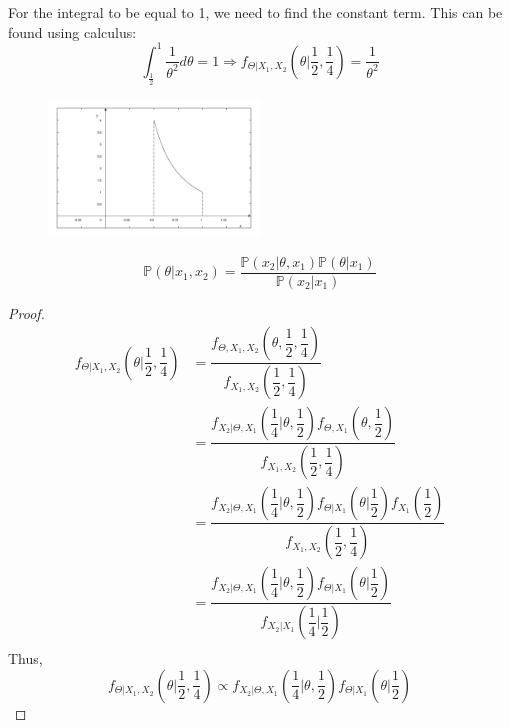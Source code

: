 \begin{eg}
  For the integral to be equal to 1, we need to find the constant term. This can be found using calculus: 
  \[
    \int_\frac{1}{2} ^1 \dfrac{1}{\theta^2} d \theta = 1 \Longrightarrow f_{\Theta \vert X_1, X_2} \left(\theta \Big| \dfrac{1}{2}, \dfrac{1}{4}\right) = \dfrac{1}{\theta^2}
  \]

  \begin{figure}[H]
    \centering
    \includegraphics[width=0.5\textwidth]{Figures/Romeo_model_2.pdf}
  \end{figure}
\end{eg}
\begin{remark}
  \[
    \mathbb{P}(\theta \vert x_1, x_2) = \dfrac{\mathbb{P}(x_2 \vert \theta, x_1) \mathbb{P}(\theta \vert x_1)}{\mathbb{P}(x_2 \vert x_1)}
  \]
\end{remark}
\begin{proof}
  \[
    \begin{aligned}
      f_{\Theta \vert X_1, X_2} \left(\theta \Big| \dfrac{1}{2}, \dfrac{1}{4}\right) &= \dfrac{f_{\Theta, X_1, X_2} \left(\theta, \dfrac{1}{2}, \dfrac{1}{4}\right)}{f_{X_1, X_2}\left(\dfrac{1}{2}, \dfrac{1}{4}\right)} \\
      &= \dfrac{f_{X_2 \vert \Theta, X_1} \left(\dfrac{1}{4} \Big| \theta, \dfrac{1}{2}\right) f_{\Theta, X_1}\left(\theta, \dfrac{1}{2}\right)}{f_{X_1, X_2}\left(\dfrac{1}{2}, \dfrac{1}{4}\right)} \\
      &= \dfrac{f_{X_2 \vert \Theta, X_1} \left(\dfrac{1}{4} \Big| \theta, \dfrac{1}{2}\right) f_{\Theta \vert X_1}\left(\theta \Big| \dfrac{1}{2}\right) f_{X_1} \left(\dfrac{1}{2}\right)}{f_{X_1, X_2}\left(\dfrac{1}{2}, \dfrac{1}{4}\right)} \\
      &= \dfrac{f_{X_2 \vert \Theta, X_1} \left(\dfrac{1}{4} \Big| \theta, \dfrac{1}{2}\right) f_{\Theta \vert X_1}\left(\theta \Big| \dfrac{1}{2}\right)}{f_{X_2 \vert X_1}\left(\dfrac{1}{4} \Big| \dfrac{1}{2}\right)} \\
    \end{aligned}
  \]
  Thus, 
  \[
    f_{\Theta \vert X_1, X_2} \left(\theta \Big| \dfrac{1}{2}, \dfrac{1}{4}\right) \propto f_{X_2 \vert \Theta, X_1} \left(\dfrac{1}{4} \Big| \theta, \dfrac{1}{2}\right) f_{\Theta \vert X_1}\left(\theta \Big| \dfrac{1}{2}\right)
  \]
\end{proof}

